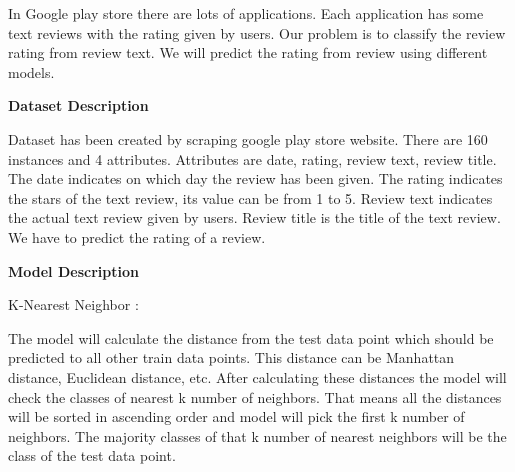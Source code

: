 \documentclass[12pt]{article}
\begin{document}
\begin{justify}
{\fontsize{14pt}{16.8pt}\selectfont In Google play store there are lots of applications. Each application has some text reviews with the rating given by users. Our problem is to classify the review rating from review text. We will predict the rating from review using different models.\par}
\end{justify}\par


\vspace{\baselineskip}
\begin{justify}
{\fontsize{14pt}{16.8pt}\selectfont \textbf{Dataset Description}\par}
\end{justify}\par

\begin{justify}
{\fontsize{14pt}{16.8pt}\selectfont Dataset has been created by scraping google play store website. There are 160 instances and 4 attributes. Attributes are date, rating, review text, review title. The date indicates on which day the review has been given. The rating indicates the stars of the text review, its value can be from 1 to 5. Review text indicates the actual text review given by users. Review title is the title of the text review. We have to predict the rating of a review.\par}
\end{justify}\par


\vspace{\baselineskip}
\begin{justify}
{\fontsize{14pt}{16.8pt}\selectfont \textbf{Model Description}\par}
\end{justify}\par

\begin{justify}
{\fontsize{14pt}{16.8pt}\selectfont K-Nearest Neighbor : \par}
\end{justify}\par

\begin{justify}
{\fontsize{14pt}{16.8pt}\selectfont The model will calculate the distance from the test data point which should be predicted to all other train data points. This distance can be Manhattan distance, Euclidean distance, etc. After calculating these distances the model will check the classes of nearest k number of neighbors. That means all the distances will be sorted in ascending order and model will pick the first k number of neighbors. The majority classes of that k number of nearest neighbors will be the class of the test data point.\par}
\end{justify}\par
\end{document}
